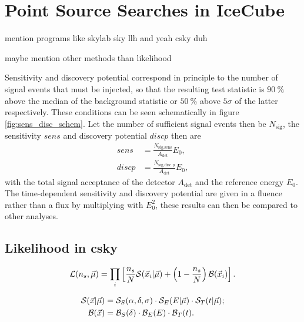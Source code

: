 \chapter{Point Source Searches in IceCube} \label{sec:theory}

mention programs like skylab sky llh and yeah csky duh

maybe mention other methods than likelihood

Sensitivity and discovery potential correspond in principle to the number of signal events that must be injected, so that the resulting test statistic is $\SI{90}{\percent}$ above the median of the background statistic or $\SI{50}{\percent}$ above $\num{5}\sigma$ of the latter respectively.
These conditions can be seen schematically in figure \ref{fig:sens_disc_schem}.
Let the number of sufficient signal events then be $N_\text{sig}$, the sensitivity $sens$ and discovery potential $disc p$ then are
\begin{align}
  sens &= \frac{N_\text{sig,sens}}{A_\text{det}}E_0, \\
  disc p &= \frac{N_\text{sig,disc p}}{A_\text{det}}E_0,
\end{align}
with the total signal acceptance of the detector $A_\text{det}$ and the reference energy $E_0$.
The time-dependent sensitivity and discovery potential are given in a fluence rather than a flux by multiplying with $E_0^2$, these results can then be compared to other analyses.

\section{Likelihood in csky}

\begin{align}
  \mathcal{L}(n_s,\vec{\mu})
  = \prod_i \left[ 
    \frac{n_s}{N} \mathcal{S}(\vec{x}_i|\vec{\mu})
    + \left( 1 - \frac{n_s}{N} \right) \mathcal{B}(\vec{x}_i)
   \right].
  \label{eq:lh}
\end{align}

\begin{align}
  \mathcal{S}(\vec{x}|\vec{\mu})
  &= \mathcal{S}_S(\alpha,\delta,\sigma)
  \cdot \mathcal{S}_E(E|\vec{\mu})
  \cdot \mathcal{S}_T(t|\vec{\mu});
  \\
  \mathcal{B}(\vec{x})
  &= \mathcal{B}_S(\delta)
  \cdot \mathcal{B}_E(E)
  \cdot \mathcal{B}_T(t).
  \label{eq:pdf}
\end{align}
